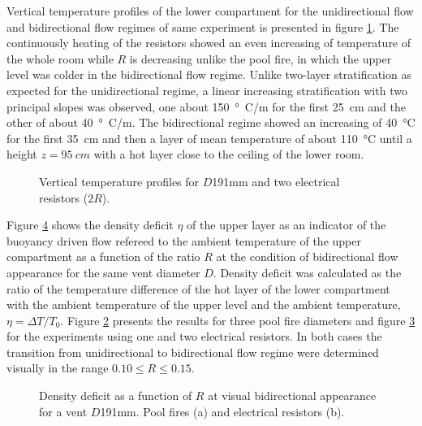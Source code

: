 \documentclass[preprint,12pt]{elsarticle}
\begin{document}
Vertical temperature profiles of the lower compartment for the unidirectional flow and bidirectional flow regimes of same experiment is presented in figure \ref{fig:profil2}. The continuously heating of the resistors showed an even increasing of temperature of the whole room while \(R\) is decreasing unlike the pool fire, in which the upper level was colder in the bidirectional flow regime. Unlike two-layer stratification as expected for the unidirectional regime, a linear increasing stratification with two principal slopes was observed, one about \SI{150}{\degree C/m} for the first \SI{25}{cm} and the other of about \SI{40}{\degree C/m}. The bidirectional regime showed an increasing of \SI{40}{\celsius} for the first \SI{35}{cm} and then a layer of mean temperature of about \SI{110}{\celsius} until a height \(z=\SI{95}{cm}\) with a hot layer close to the ceiling of the lower room.

\begin{figure}[h!]
\centering
\resizebox{0.53\textwidth}{!}{}
\caption{Vertical temperature profiles for $D$191mm and two electrical resistors ($2R$).}
\label{fig:profil2}
\end{figure}

Figure \ref{fig:eta_R_N_D191} shows the density deficit \(\eta\) of the upper layer as an indicator of the buoyancy driven flow refereed to the ambient temperature of the upper compartment as a function of the ratio \(R\) at the condition of bidirectional flow appearance for the same vent diameter \(D\). Density deficit was calculated as the ratio of the temperature difference of the hot layer of the lower compartment with the ambient temperature of the upper level and the ambient temperature, \(\eta=\Delta T/T_0\). Figure \ref{fig:eta_N_D191} presents the results for three pool fire diameters and figure \ref{fig:eta_R_D191} for the experiments using one and two electrical resistors. In both cases the transition from unidirectional to bidirectional flow regime were determined visually in the range \(0.10\leqslant R \leqslant 0.15\).

\begin{figure}[h]
\centering
\begin{subfigure}[b]{0.48\textwidth}
  \centering
  \resizebox{\textwidth}{!}{}
  \caption{}
  \label{fig:eta_N_D191}
\end{subfigure}
\begin{subfigure}[b]{0.48\textwidth}
  \centering
  \resizebox{\linewidth}{!}{}
  \caption{}
  \label{fig:eta_R_D191}
  \end{subfigure}
\caption{Density deficit as a function of $R$ at visual bidirectional appearance for a vent $D$191mm. Pool fires (a) and electrical resistors (b).}
\label{fig:eta_R_N_D191}
\end{figure}
\end{document}
